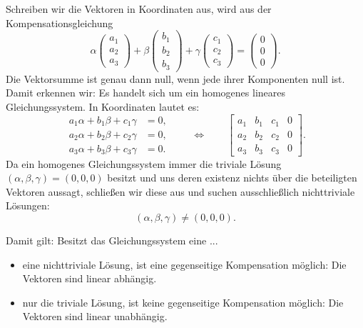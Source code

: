 Schreiben wir die Vektoren in Koordinaten aus, wird aus der
Kompensationsgleichung
\[
  \alpha\begin{pmatrix}a_1\\a_2\\a_3\end{pmatrix}
  +\beta\begin{pmatrix}b_1\\b_2\\b_3\end{pmatrix}
  +\gamma\begin{pmatrix}c_1\\c_2\\c_3\end{pmatrix}
  =\begin{pmatrix}0\\0\\0\end{pmatrix}.
\]
Die Vektorsumme ist genau dann null, wenn jede ihrer Komponenten null ist.
Damit erkennen wir: Es handelt sich um ein homogenes lineares Gleichungssystem.
In Koordinaten lautet es:
\[
  \begin{aligned}
    a_1\alpha+b_1\beta+c_1\gamma&=0,\\
    a_2\alpha+b_2\beta+c_2\gamma&=0,\\
    a_3\alpha+b_3\beta+c_3\gamma&=0.
  \end{aligned}
  \qquad\Longleftrightarrow\qquad
  \left[
    \begin{array}{ccc|c}
      a_1&b_1&c_1&0\\
      a_2&b_2&c_2&0\\
      a_3&b_3&c_3&0
    \end{array}
  \right].
\]
Da ein homogenes Gleichungssystem immer die triviale Lösung
$(\alpha,\beta,\gamma)=(0,0,0)$ besitzt und uns deren existenz nichts
über die beteiligten Vektoren aussagt, schließen wir diese aus und suchen
ausschließlich nichttriviale Lösungen:
\[
  (\alpha,\beta,\gamma)\ne(0,0,0).
\]

Damit gilt: Besitzt das Gleichungssystem eine ...
\begin{itemize}[leftmargin=1.6em,itemsep=0.25em]
  \item eine nichttriviale Lösung, ist eine
    gegenseitige Kompensation möglich: Die Vektoren sind linear abhängig.
  \item nur die triviale Lösung, ist keine gegenseitige Kompensation
    möglich: Die Vektoren sind linear unabhängig.
\end{itemize}

